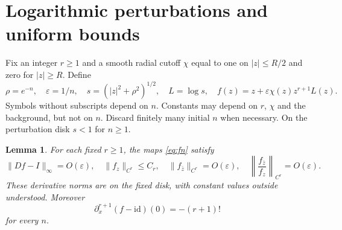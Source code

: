 \documentclass[11pt]{article}
\newtheorem{lemma}{Lemma}
\newcommand{\id}{\mathrm{id}}
\begin{document}
\section{Logarithmic perturbations and uniform bounds}
Fix an integer $r\geq1$ and a smooth radial cutoff $\chi$ equal to one on $|z|\leq R/2$ and zero for $|z|\geq R$. Define
\begin{equation}\label{eq:fn}
 \rho=e^{-n},\quad \varepsilon=1/n,\quad s=(|z|^2+\rho^2)^{1/2},
 \quad L=\log s,\quad f(z)=z+\varepsilon\chi(z)z^{r+1}L(z).
\end{equation}
Symbols without subscripts depend on $n$. Constants may depend on $r$, $\chi$ and the background, but not on $n$. Discard finitely many initial $n$ when necessary. On the perturbation disk $s<1$ for $n\geq1$.

\begin{lemma}\label{lem:bounds}
For each fixed $r\geq1$, the maps \eqref{eq:fn} satisfy
\[
 \|Df-I\|_\infty=O(\varepsilon),\quad
 \|f_z\|_{C^r}\leq C_r,\quad
 \|f_{\bar z}\|_{C^r}=O(\varepsilon),\quad
 \left\|\frac{f_{\bar z}}{f_z}\right\|_{C^r}=O(\varepsilon).
\]
These derivative norms are on the fixed disk, with constant values outside understood. Moreover
\begin{equation}\label{eq:jet}
 \partial_x^{r+1}(f-\id)(0)=-(r+1)!
\end{equation}
for every $n$.
\end{lemma}
\end{document}
